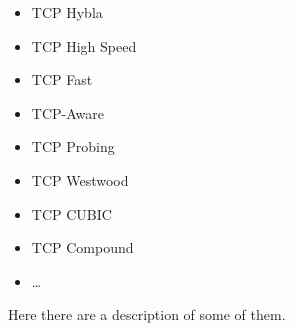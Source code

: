 \begin{itemize}
\begin{itemize}
\begin{minipage}{0.3 \textwidth}
\begin{itemize}
                \item TCP Hybla
                \item TCP High Speed
                \item TCP Fast
            \end{itemize}
        \end{minipage}
        \begin{minipage}{0.3 \textwidth}
            \begin{itemize}
                \item TCP-Aware
                \item TCP Probing
                \item TCP Westwood
                \item TCP CUBIC
                \item TCP Compound
                \item \dots
            \end{itemize}
        \end{minipage}
    \end{itemize}
\end{itemize}
Here there are a description of some of them.

